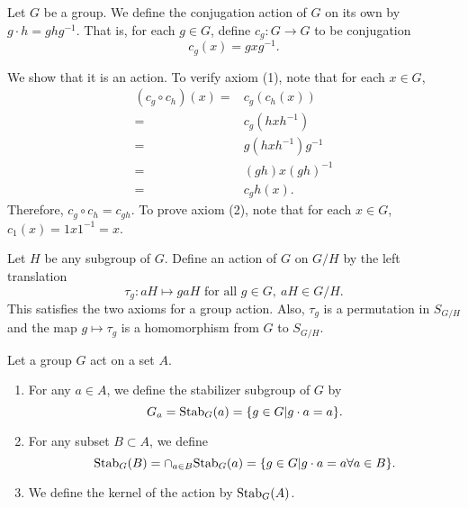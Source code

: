 \begin{example}
    Let $G$ be a group. We define the conjugation action of $G$ on its own by $g\cdot h = ghg^{-1}$.
    That is, for each $g \in G$, define $c_g \colon G \to G$
    to be conjugation
    $$
        c_g(x)=gxg^{-1}.
    $$

    We show that it is an action.
    To verify axiom (1), note that for each $x \in G$,
    \begin{align*}
        (c_g \circ c_h)(x) = & c_g(c_h(x))       \\
        =                    & c_g(hxh^{-1})     \\
        =                    & g(hxh^{-1})g^{-1} \\
        =                    & (gh)x(gh)^{-1}    \\
        =                    & c_gh(x).
    \end{align*}
    Therefore, $c_g \circ c_h = c_{gh}$.
    To prove axiom (2), note that for each $x \in G$,
    $c_1(x) = 1x1^{-1} = x$.
\end{example}


\begin{example}
    Let $H$ be any subgroup of $G$.
    Define an action of $G$ on $G/H$ by the left translation
    $$
        \tau_g\colon  aH \mapsto gaH \text{ for all } g\in G,~ aH\in G/H.
    $$
    This satisfies the two axioms for a group action.
    Also, $\tau_g$ is a permutation in $S_{G/H}$ and the map $g\mapsto \tau_g$ is a homomorphism from $G$ to $S_{G/H}$.
\end{example}


\begin{defi}[Stabilizers]
    Let a group $G$ act on a set $A$.
    \begin{enumerate}
        \item For any $a \in A$, we define the stabilizer subgroup of $G$ by
              \[
                  G_a = {\rm Stab}_G(a) = \{g \in G \vert g \cdot a = a\}.
              \]

        \item For any subset $B \subset A$, we define
              \[
                  {\rm Stab}_G(B) = \cap_{a\in B} {\rm Stab}_G(a) = \{g \in G \vert g\cdot a = a \forall a \in B\}.\]

        \item We define the kernel of the action by ${\rm Stab}_G(A)$.
    \end{enumerate}
\end{defi}

